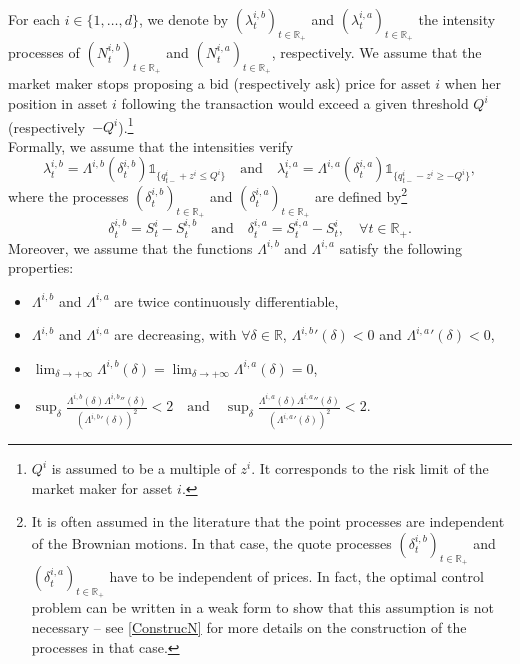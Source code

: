 \documentclass[preprint, 3p]{elsarticle}
\newcommand{\Rr}{{\mathbb{R}}}
\newcommand{\1}{{\chi}}
\begin{document}
For each $i \in \{1,\ldots,d\}$, we denote by $(\lambda_t^{i,b})_{t \in \mathbb R_+}$ and $(\lambda_t^{i,a})_{t \in \mathbb R_+}$ the intensity processes of $(N^{i,b}_t)_{t \in \mathbb R_+}$ and $(N^{i,a}_t)_{t \in \mathbb R_+}$, respectively. We assume that the market maker stops proposing a bid (respectively ask) price for asset  $i$ when her position in asset $i$ following the transaction would exceed a given threshold $Q^i$ (respectively~$-Q^i$).\footnote{$Q^i$ is assumed to be a multiple of $z^i$. It corresponds to the risk limit of the market maker for asset $i$.}\\

Formally, we assume that the intensities verify
$$
\lambda^{i,b}_t=\Lambda^{i,b}(\delta_t^{i,b}) \mathds{1}_{\{q^i_{t-} + z^i \le Q^i\}}\quad\mbox{and}\quad\lambda^{i,a}_t=\Lambda^{i,a}(\delta_t^{i,a})\mathds{1}_{\{q^i_{t-} - z^i \ge -Q^i\}},
$$
where the processes $(\delta^{i,b}_t)_{t \in \mathbb R_+}$ and $(\delta^{i,a}_t)_{t \in \mathbb R_+}$ are defined by\footnote{It is often assumed in the literature that the point processes are independent of the Brownian motions. In that case, the quote processes $(\delta^{i,b}_t)_{t \in \mathbb R_+}$ and $(\delta^{i,a}_t)_{t \in \mathbb R_+}$ have to be independent of prices. In fact, the optimal control problem can be written in a weak form to show that this assumption is not necessary -- see \ref{ConstrucN} for more details on the construction of the processes in that case.}
\[
\delta_t^{i,b}=S_t^{i}-S_t^{i,b}\quad \mbox{and}\quad \delta_t^{i,a}=S_t^{i,a}-S_t^{i}, \quad \forall t \in \mathbb R_+.
\]
Moreover, we assume that the functions $\Lambda^{i,b}$ and $\Lambda^{i,a}$ satisfy the following properties:

\begin{itemize}
	\item $\Lambda^{i,b}$ and $\Lambda^{i,a}$ are twice continuously differentiable,
	\item $\Lambda^{i,b}$ and $\Lambda^{i,a}$ are decreasing, with $\forall \delta \in \Rr$, ${\Lambda^{i,b}}'(\delta) <0$ and ${\Lambda^{i,a}}'(\delta) <0$,
	\item $\lim_{\delta \to +\infty} \Lambda^{i,b}(\delta) = \lim_{\delta \to +\infty} \Lambda^{i,a}(\delta) = 0$,
	\item $\sup_{\delta} \frac{\Lambda^{i,b}(\delta){\Lambda^{i,b}}''(\delta)}{ \left({\Lambda^{i,b}}'(\delta)\right)^2} < 2 \quad \text{and} \quad \sup_{\delta} \frac{\Lambda^{i,a}(\delta){\Lambda^{i,a}}''(\delta)}{\left({\Lambda^{i,a}}'(\delta)\right)^2}  < 2.$\\
\end{itemize}
\end{document}

